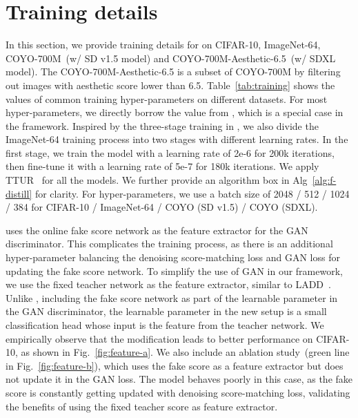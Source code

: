 \section{Training details}


\label{app:details}

In this section, we provide training details for \methodtext on CIFAR-10, ImageNet-64, COYO-700M~(w/ SD v1.5 model) and COYO-700M-Aesthetic-6.5~(w/ SDXL model). The COYO-700M-Aesthetic-6.5 is a subset of COYO-700M by filtering out images with aesthetic score lower than 6.5. Table~\ref{tab:training} shows the values of common training hyper-parameters on different datasets. For most hyper-parameters, we directly borrow the value from \cite{yin2024improved}, which is a special case in the \methodtext framework. Inspired by the three-stage training in  \cite{yin2024improved}, we also divide the ImageNet-64 training process into two stages with different learning rates. In the first stage, we train the model with a learning rate of 2e-6 for 200k iterations, then fine-tune it with a learning rate of 5e-7 for 180k iterations. We apply TTUR~\cite{yin2024improved} for all the models. We further provide an algorithm box in Alg~\ref{alg:f-distill} for clarity. For hyper-parameters, we use a batch size of 2048 / 512 / 1024 / 384 for CIFAR-10 / ImageNet-64 / COYO (SD v1.5) / COYO (SDXL).

\cite{yin2024improved} uses the online fake score network as the feature extractor for the GAN discriminator. This complicates the training process, as there is an additional hyper-parameter balancing the denoising score-matching loss and GAN loss for updating the fake score network. To simplify the use of GAN in our framework, we use the fixed teacher network as the feature extractor, similar to LADD~\cite{sauer2024fast}. Unlike \cite{yin2024improved}, including the fake score network as part of the learnable parameter in the GAN discriminator, the learnable parameter in the new setup is a small classification head whose input is the feature from the teacher network. We empirically observe that the modification leads to better performance on CIFAR-10, as shown in Fig.~\ref{fig:feature-a}. We also include an ablation study~(green line in Fig.~\ref{fig:feature-b}), which uses the fake score as a feature extractor but does not update it in the GAN loss. The model behaves poorly in this case, as the fake score is constantly getting updated with denoising score-matching loss, validating the benefits of using the fixed teacher score as feature extractor.

